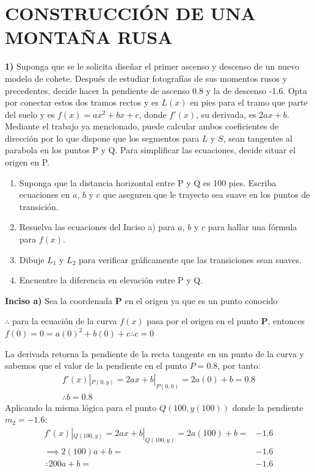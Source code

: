 \chapter*{CONSTRUCCIÓN DE UNA MONTAÑA RUSA}

\textbf{1)} Suponga que se le solicita diseñar el primer ascenso y descenso de un nuevo modelo de cohete. Después de estudiar fotografías de sus momentos rusos y precedentes, decide hacer la pendiente de ascenso 0.8 y la de descenso -1.6. Opta por conectar estos dos tramos rectos y es \( L(x) \) en pies para el tramo que parte del suelo y es \( f(x)= ax^2 + bx + c \), donde \( f'(x) \), su derivada, es \( 2ax + b \). Mediante el trabajo ya mencionado, puede calcular ambos coeficientes de dirección por lo que dispone que los segmentos para \( L \) y \( S \), sean tangentes al parabola en los puntos P y Q. Para simplificar las ecuaciones, decide situar el origen en P.

\begin{enumerate}[label=\alph*)]
	\item Suponga que la distancia horizontal entre P y Q es 100 pies. Escriba ecuaciones en \( a \), \( b \) y \( c \) que aseguren que le trayecto sea suave en los puntos de transición.
	\item Resuelva las ecuaciones del Inciso a) para \( a \), \( b \) y \( c \) para hallar una fórmula para \( f(x) \).
	\item Dibuje \( L_1 \) y \( L_2 \) para verificar gráficamente que las transiciones sean suaves.
	\item Encuentre la diferencia en elevación entre P y Q.
\end{enumerate}

\textbf{Inciso a)} Sea la coordenada \textbf{P} en el origen ya que es un punto conocido

$\therefore$ para la ecuación de la curva $f(x)$ pasa por el origen en el punto \textbf{P}, entonces $f(0)=0=a(0)^2 + b(0) + c \therefore c=0$

La derivada retorna la pendiente de la recta tangente en un punto de la curva y sabemos que el valor de la pendiente en el punto $P = 0.8$, por tanto:
\begin{align*}
	f'(x)|_{P(0,y)}=2ax+b|_{P(0,0)}=2a(0)+b=0.8 \\
	\therefore b=0.8
\end{align*}
Aplicando la misma lógica para el punto $Q(100,y(100))$ donde la pendiente $m_2=-1.6$:
\begin{align*}
	f'(x)|_{Q(100,y)}=2ax+b|_{Q(100,y)}=2a(100)+b= & -1.6 \\
	\implies 2(100)a+b=                            & -1.6 \\
	\therefore 200a+b=                             & -1.6 \\
\end{align*}

